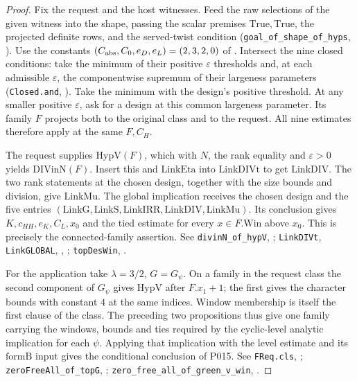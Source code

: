\begin{proof}
Fix the request and the host witnesses. Feed the raw selections of the
given witness into the shape, passing the scalar premises
$\mathrm{True},\mathrm{True}$, the projected definite rows, and the
served-twist condition (\nolinkurl{goal_of_shape_of_hyps},
). Use the constants
$(C_{\rm abs},C_0,e_D,e_L)=(2,3,2,0)$ of
.
Intersect the nine closed conditions: take the minimum of their
positive $\varepsilon$ thresholds and, at each admissible $\varepsilon$,
the componentwise supremum of their largeness parameters
(\nolinkurl{Closed.and}, ).
Take the minimum with the design's positive threshold. At any smaller
positive $\varepsilon$, ask for a design at this common largeness
parameter. Its family $F$ projects both to the original class and to
the request. All nine estimates therefore apply at the same $F,C_H$.

The request supplies $\mathrm{HypV}(F)$, which with $N$, the rank
equality and $\varepsilon>0$ yields $\mathrm{DIVinN}(F)$.
Insert this and $\mathrm{LinkEta}$ into $\mathrm{LinkDIVt}$ to get
$\mathrm{LinkDIV}$. The two rank statements at the chosen design,
together with the size bounds and division, give $\mathrm{LinkMu}$.
The global implication receives the chosen design and the five entries
$(\mathrm{LinkG},\mathrm{LinkS},\mathrm{LinkIRR},\mathrm{LinkDIV},\mathrm{LinkMu})$.
Its conclusion gives $K,c_{HH},e_K,C_L,x_0$ and the tied estimate
for every $x\in F.\mathrm{Win}$ above $x_0$. This is precisely
the connected-family assertion. See \nolinkurl{divinN_of_hypV},
;
\nolinkurl{LinkDIVt}, \nolinkurl{LinkGLOBAL},
, ;
\nolinkurl{topDesWin}, .

For the application take $\lambda=3/2$, $G=G_\psi$.
On a family in the request class the second component of $G_\psi$ gives
$\mathrm{HypV}$ after $F.x_1+1$; the first gives the character bounds
with constant $4$ at the same indices. Window membership is itself
the first clause of the class. The preceding two propositions thus give
one family carrying the windows, bounds and ties required by the
cyclic-level analytic implication for each $\psi$. Applying that
implication with the level estimate and its $\mathrm{formB}$ input
gives the conditional conclusion of P015. See \nolinkurl{FReq.cls},
; \nolinkurl{zeroFreeAll_of_topG},
;
\nolinkurl{zero_free_all_of_green_v_win}, .
\end{proof}
